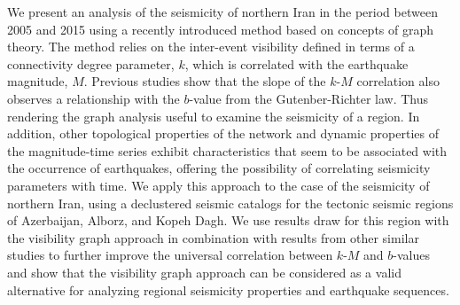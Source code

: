 %
We present an analysis of the seismicity of northern Iran in the period between 2005 and 2015 using a recently introduced method based on concepts of graph theory. The method relies on the inter-event visibility defined in terms of a connectivity degree parameter, $k$, which is correlated with the earthquake magnitude, $M$. Previous studies show that the slope of the $k$-$M$ correlation also observes a relationship with the $b$-value from the Gutenber-Richter law. Thus rendering the graph analysis useful to examine the seismicity of a region. In addition, other topological properties of the network and dynamic properties of the magnitude-time series exhibit characteristics that seem to be associated with the occurrence of earthquakes, offering the possibility of correlating seismicity parameters with time. We apply this approach to the case of the seismicity of northern Iran, using a declustered seismic catalogs for the tectonic seismic regions of Azerbaijan, Alborz, and Kopeh Dagh. We use results draw for this region with the visibility graph approach in combination with results from other similar studies to further improve the universal correlation between $k$-$M$ and $b$-values and show that the visibility graph approach can be considered as a valid alternative for analyzing regional seismicity properties and earthquake sequences.




